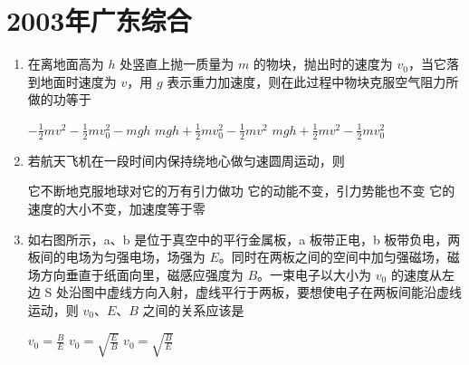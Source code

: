 \documentclass[\gkver]{gaokaozhenti}
\begin{document}
\chapter{2003年广东综合}

\begin{enumerate}
\item
在离地面高为 $h$ 处竖直上抛一质量为 $m$ 的物块，抛出时的速度为 $v_{0}$，当它落到地面时速度为 $v$，用 $g$ 表示重力加速度，则在此过程中物块克服空气阻力所做的功等于

{$- \frac{1}{2}mv^{2} - \frac{1}{2}mv_{0}^{2} - mgh$}
{$mgh + \frac{1}{2}mv_{0}^{2} - \frac{1}{2}mv^{2}$}
{$mgh + \frac{1}{2}mv^{2} - \frac{1}{2}mv_{0}^{2}$}


\item
若航天飞机在一段时间内保持绕地心做匀速圆周运动，则

{它不断地克服地球对它的万有引力做功}
{它的动能不变，引力势能也不变}
{它的速度的大小不变，加速度等于零}


\item
如右图所示，a、b 是位于真空中的平行金属板，a 板带正电，b 板带负电，两板间的电场为匀强电场，场强为 $E$。同时在两板之间的空间中加匀强磁场，磁场方向垂直于纸面向里，磁感应强度为 $B$。一束电子以大小为 $v_{0}$ 的速度从左边 S 处沿图中虚线方向入射，虚线平行于两板，要想使电子在两板间能沿虚线运动，则 $v_{0}$、$E$、$B$ 之间的关系应该是


{$v_{0} = \frac{B}{E}$}
{$v_{0} = \sqrt{\frac{E}{B}}$}
{$v_{0} = \sqrt{\frac{B}{E}}$}


\end{enumerate}
\end{document}
